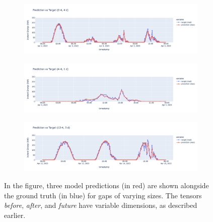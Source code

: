 
\begin{figure}[]
	\centering
	\begin{subfigure}{\textwidth}
		\centering
		\includegraphics[width=.9\textwidth]{chapters/3_models/imgs/grrun/eval/grruneval24.png}
		\caption{}
	\end{subfigure}
	\begin{subfigure}{\textwidth}
		\centering
		\includegraphics[width=.9\textwidth]{chapters/3_models/imgs/grrun/eval/grruneval44.png}
		\caption{}
	\end{subfigure}
	\begin{subfigure}{\textwidth}
		\centering
		\includegraphics[width=.9\textwidth]{chapters/3_models/imgs/grrun/eval/grruneval124.png}
		\caption{}
	\end{subfigure}
	\caption{In the figure, three model predictions (in red) are shown alongside the ground truth (in blue) for gaps of varying sizes. The tensors \textit{before}, \textit{after}, and \textit{future} have variable dimensions, as described earlier.}
	\label{fig:grrunevalplots}
\end{figure}

